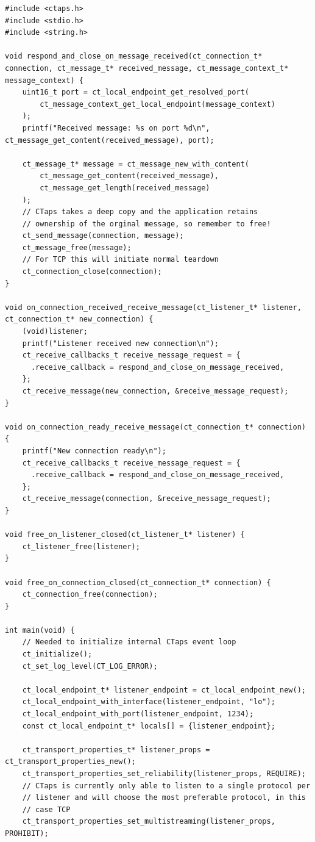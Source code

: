\newpage
{%
  \captionsetup{type=listing}%
\begin{verbatim}
#include <ctaps.h>
#include <stdio.h>
#include <string.h>

void respond_and_close_on_message_received(ct_connection_t* connection, ct_message_t* received_message, ct_message_context_t* message_context) {
    uint16_t port = ct_local_endpoint_get_resolved_port(
        ct_message_context_get_local_endpoint(message_context)
    );
    printf("Received message: %s on port %d\n", ct_message_get_content(received_message), port);

    ct_message_t* message = ct_message_new_with_content(
        ct_message_get_content(received_message),
        ct_message_get_length(received_message)
    );
    // CTaps takes a deep copy and the application retains
    // ownership of the orginal message, so remember to free!
    ct_send_message(connection, message);
    ct_message_free(message);
    // For TCP this will initiate normal teardown
    ct_connection_close(connection);
}

void on_connection_received_receive_message(ct_listener_t* listener, ct_connection_t* new_connection) {
    (void)listener;
    printf("Listener received new connection\n");
    ct_receive_callbacks_t receive_message_request = {
      .receive_callback = respond_and_close_on_message_received,
    };
    ct_receive_message(new_connection, &receive_message_request);
}

void on_connection_ready_receive_message(ct_connection_t* connection) {
    printf("New connection ready\n");
    ct_receive_callbacks_t receive_message_request = {
      .receive_callback = respond_and_close_on_message_received,
    };
    ct_receive_message(connection, &receive_message_request);
}

void free_on_listener_closed(ct_listener_t* listener) {
    ct_listener_free(listener);
}

void free_on_connection_closed(ct_connection_t* connection) {
    ct_connection_free(connection);
}

int main(void) {
    // Needed to initialize internal CTaps event loop
    ct_initialize();
    ct_set_log_level(CT_LOG_ERROR);

    ct_local_endpoint_t* listener_endpoint = ct_local_endpoint_new();
    ct_local_endpoint_with_interface(listener_endpoint, "lo");
    ct_local_endpoint_with_port(listener_endpoint, 1234);
    const ct_local_endpoint_t* locals[] = {listener_endpoint};

    ct_transport_properties_t* listener_props = ct_transport_properties_new();
    ct_transport_properties_set_reliability(listener_props, REQUIRE);
    // CTaps is currently only able to listen to a single protocol per
    // listener and will choose the most preferable protocol, in this
    // case TCP
    ct_transport_properties_set_multistreaming(listener_props, PROHIBIT);


\end{verbatim}}
